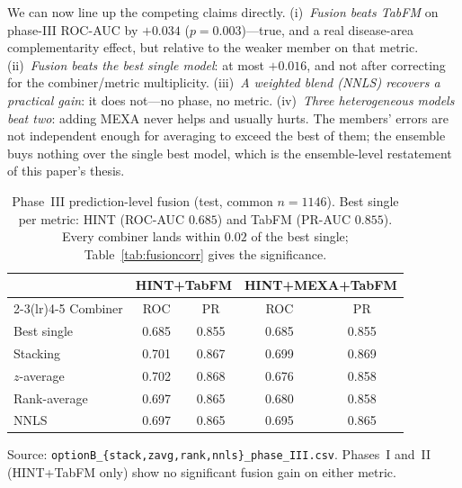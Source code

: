\documentclass[a4paper,fleqn]{cas-sc}
\begin{document}
We can now line up the competing claims directly. (i)~\emph{Fusion beats TabFM} on phase-III
ROC-AUC by $+0.034$ ($p=0.003$)---true, and a real disease-area complementarity effect, but
relative to the weaker member on that metric. (ii)~\emph{Fusion beats the best single model}:
at most $+0.016$, and not after correcting for the combiner/metric multiplicity. (iii)~\emph{A
weighted blend (NNLS) recovers a practical gain}: it does not---no phase, no metric.
(iv)~\emph{Three heterogeneous models beat two}: adding MEXA never helps and usually hurts.
The members' errors are not independent enough for averaging to exceed the best of them; the
ensemble buys nothing over the single best model, which is the ensemble-level restatement of
this paper's thesis.
\begin{table}[t]
\centering\small
\caption{Phase~III prediction-level fusion (test, common $n{=}1146$). Best single per metric:
HINT (ROC-AUC $0.685$) and TabFM (PR-AUC $0.855$). Every combiner lands within $0.02$ of the
best single; Table~\ref{tab:fusioncorr} gives the significance.}
\label{tab:fusion}
\begin{tabular}{lcccc}
\toprule
 & \multicolumn{2}{c}{HINT+TabFM} & \multicolumn{2}{c}{HINT+MEXA+TabFM} \\
\cmidrule(lr){2-3}\cmidrule(lr){4-5}
Combiner & ROC & PR & ROC & PR \\
\midrule
Best single & 0.685 & 0.855 & 0.685 & 0.855 \\
Stacking          & 0.701 & 0.867 & 0.699 & 0.869 \\
$z$-average       & 0.702 & 0.868 & 0.676 & 0.858 \\
Rank-average      & 0.697 & 0.865 & 0.680 & 0.858 \\
NNLS              & 0.697 & 0.865 & 0.695 & 0.865 \\
\bottomrule
\end{tabular}
\begin{minipage}{\linewidth}\vspace{2pt}\scriptsize Source: \texttt{optionB\_\{stack,zavg,rank,nnls\}\_phase\_III.csv}. Phases~I and~II (HINT+TabFM only) show no significant fusion gain on either metric. \end{minipage}
\end{table}
\end{document}
